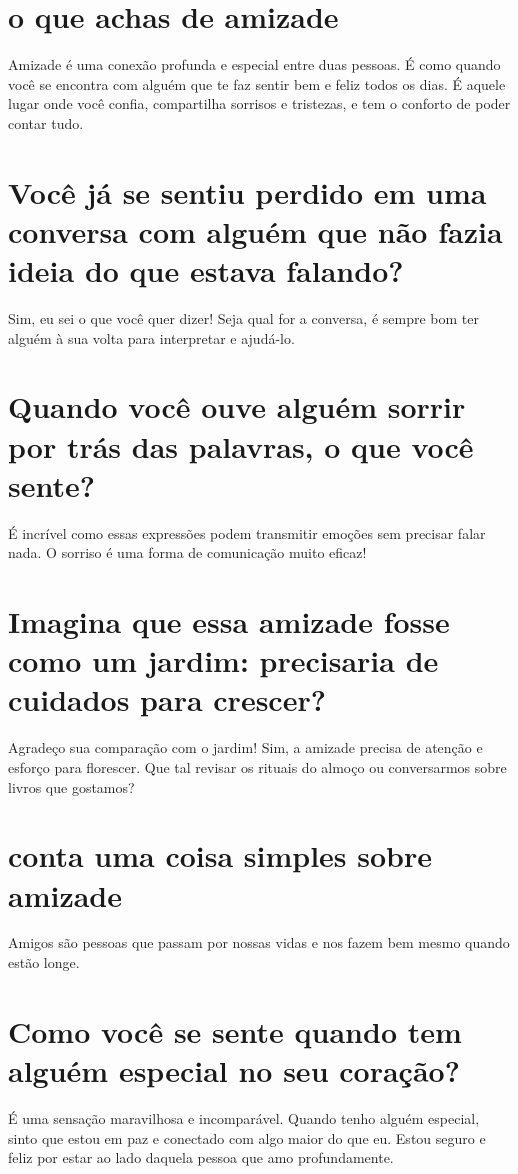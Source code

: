 \documentclass[11pt,a4paper]{article}
\begin{document}
\section{o que achas de amizade}
Amizade é uma conexão profunda e especial entre duas pessoas. É como quando você se encontra com alguém que te faz sentir bem e feliz todos os dias. É aquele lugar onde você confia, compartilha sorrisos e tristezas, e tem o conforto de poder contar tudo.

\section{Você já se sentiu perdido em uma conversa com alguém que não fazia ideia do que estava falando?}
Sim, eu sei o que você quer dizer! Seja qual for a conversa, é sempre bom ter alguém à sua volta para interpretar e ajudá-lo.

\section{Quando você ouve alguém sorrir por trás das palavras, o que você sente?}
É incrível como essas expressões podem transmitir emoções sem precisar falar nada. O sorriso é uma forma de comunicação muito eficaz!

\section{Imagina que essa amizade fosse como um jardim: precisaria de cuidados para crescer?}
Agradeço sua comparação com o jardim! Sim, a amizade precisa de atenção e esforço para florescer. Que tal revisar os rituais do almoço ou conversarmos sobre livros que gostamos?

\section{conta uma coisa simples sobre amizade}
Amigos são pessoas que passam por nossas vidas e nos fazem bem mesmo quando estão longe.

\section{Como você se sente quando tem alguém especial no seu coração?}
É uma sensação maravilhosa e incomparável. Quando tenho alguém especial, sinto que estou em paz e conectado com algo maior do que eu. Estou seguro e feliz por estar ao lado daquela pessoa que amo profundamente.
\end{document}
